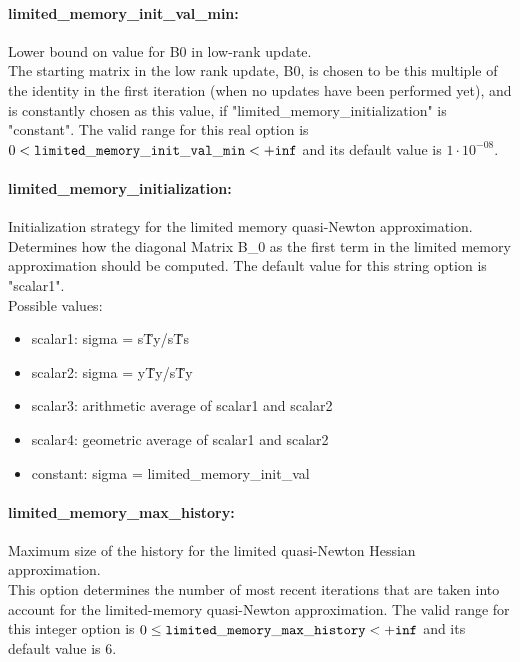 \paragraph{limited\_memory\_init\_val\_min:}\label{opt:limited_memory_init_val_min} Lower bound on value for B0 in low-rank update. \\
 The starting matrix in the low rank update, B0, is chosen to be this multiple of the identity in the first iteration (when no updates have been performed yet), and is constantly chosen as this value, if "limited\_memory\_initialization" is "constant". The valid range for this real option is 
$0 <  {\tt limited\_memory\_init\_val\_min } <  {\tt +inf}$
and its default value is $1 \cdot 10^{-08}$.


\paragraph{limited\_memory\_initialization:}\label{opt:limited_memory_initialization} Initialization strategy for the limited memory quasi-Newton approximation. \\
 Determines how the diagonal Matrix B\_0 as the first term in the limited memory approximation should be computed. The default value for this string option is "scalar1".
\\ 
Possible values:
\begin{itemize}
   \item scalar1: sigma = s\^Ty/s\^Ts
   \item scalar2: sigma = y\^Ty/s\^Ty
   \item scalar3: arithmetic average of scalar1 and scalar2
   \item scalar4: geometric average of scalar1 and scalar2
   \item constant: sigma = limited\_memory\_init\_val
\end{itemize}

\paragraph{limited\_memory\_max\_history:}\label{opt:limited_memory_max_history} Maximum size of the history for the limited quasi-Newton Hessian approximation. \\
 This option determines the number of most recent iterations that are taken into account for the limited-memory quasi-Newton approximation. The valid range for this integer option is
$0 \le {\tt limited\_memory\_max\_history } <  {\tt +inf}$
and its default value is $6$.


